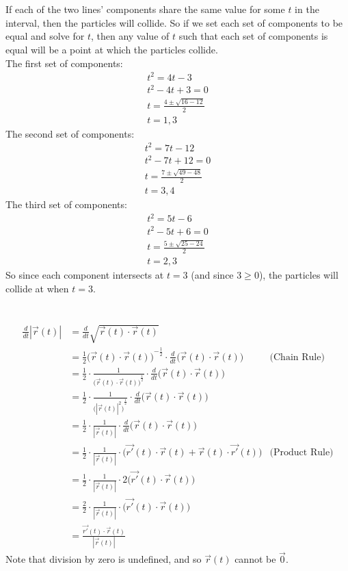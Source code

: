 \documentclass{article}
\begin{document}
\section{}
	If each of the two lines' components share the same value for some $t$ in the interval, then
	the particles will collide. So if we set each set of components to be equal and solve for $t$,
	then any value of $t$ such that each set of components is equal will be a point at which the particles
	collide.\\
	The first set of components:
	\begin{align*}
		t^2=4t-3\\
		t^2-4t+3=0\\
		t=\frac{4\pm\sqrt{16-12}}{2}\\
		t=1,3
	\end{align*}
	The second set of components:
	\begin{align*}
		t^2=7t-12\\
		t^2-7t+12=0\\
		t=\frac{7\pm\sqrt{49-48}}{2}\\
		t=3,4
	\end{align*}
	The third set of components:
	\begin{align*}
		t^2=5t-6\\
		t^2-5t+6=0\\
		t=\frac{5\pm\sqrt{25-24}}{2}\\
		t=2,3
	\end{align*}
	So since each component intersects at $t=3$ (and since $3\ge0$), the particles will collide at when $t=3$.
\section{}
	\begin{align*}
		\frac{d}{dt}|\vec{r}(t)|&=\frac{d}{dt}\sqrt{\vec{r}(t)\cdot\vec{r}(t)}\\
		&=\frac{1}{2}{\bigg(\vec{r}(t)\cdot\vec{r}(t)\bigg)}^{-\frac{1}{2}}\cdot\frac{d}{dt}{\bigg(\vec{r}(t)\cdot\vec{r}(t)\bigg)}&\text{(Chain Rule)}\\
		&=\frac{1}{2}\cdot\frac{1}{{\bigg(\vec{r}(t)\cdot\vec{r}(t)\bigg)}^{\frac{1}{2}}}\cdot\frac{d}{dt}{\bigg(\vec{r}(t)\cdot\vec{r}(t)\bigg)}\\
		&=\frac{1}{2}\cdot\frac{1}{{\bigg(|\vec{r}(t)|^2\bigg)}^{\frac{1}{2}}}\cdot\frac{d}{dt}{\bigg(\vec{r}(t)\cdot\vec{r}(t)\bigg)}\\
		&=\frac{1}{2}\cdot\frac{1}{|\vec{r}(t)|}\cdot\frac{d}{dt}{\bigg(\vec{r}(t)\cdot\vec{r}(t)\bigg)}\\
		&=\frac{1}{2}\cdot\frac{1}{|\vec{r}(t)|}\cdot{\bigg(\vec{r'}(t)\cdot\vec{r}(t)+\vec{r}(t)\cdot\vec{r'}(t)\bigg)}&\text{(Product Rule)}\\
		&=\frac{1}{2}\cdot\frac{1}{|\vec{r}(t)|}\cdot2{\bigg(\vec{r'}(t)\cdot\vec{r}(t)\bigg)}\\
		&=\frac{2}{2}\cdot\frac{1}{|\vec{r}(t)|}\cdot{\bigg(\vec{r'}(t)\cdot\vec{r}(t)\bigg)}\\
		&=\frac{\vec{r'}(t)\cdot\vec{r}(t)}{|\vec{r}(t)|}
	\end{align*}
	Note that division by zero is undefined, and so $\vec{r}(t)$ cannot be $\vec{0}$.
\end{document}
